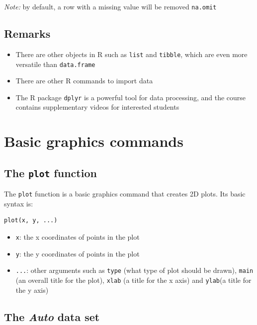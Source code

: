 \documentclass[]{article}
\providecommand{\tightlist}{%
  \setlength{\itemsep}{0pt}\setlength{\parskip}{0pt}}
\begin{document}
\emph{Note:} by default, a row with a missing value will be removed
\texttt{na.omit}

\subsection{Remarks}\label{remarks}

\begin{itemize}
\tightlist
\item
  There are other objects in R such as \texttt{list} and
  \texttt{tibble}, which are even more versatile than
  \texttt{data.frame}
\item
  There are other R commands to import data
\item
  The R package \texttt{dplyr} is a powerful tool for data processing,
  and the course contains supplementary videos for interested students
\end{itemize}

\section{Basic graphics commands}\label{basic-graphics-commands}

\subsection{\texorpdfstring{The \texttt{plot}
function}{The plot function}}\label{the-plot-function}

The \texttt{plot} function is a basic graphics command that creates 2D
plots. Its basic syntax is:

\begin{verbatim}
plot(x, y, ...)
\end{verbatim}

\begin{itemize}
\tightlist
\item
  \texttt{x}: the x coordinates of points in the plot
\item
  \texttt{y}: the y coordinates of points in the plot
\item
  \texttt{...}: other arguments such as \texttt{type} (what type of plot
  should be drawn), \texttt{main} (an overall title for the plot),
  \texttt{xlab} (a title for the x axis) and \texttt{ylab}(a title for
  the y axis)
\end{itemize}

\subsection{\texorpdfstring{The \emph{Auto} data
set}{The Auto data set}}\label{the-auto-data-set}
\end{document}
